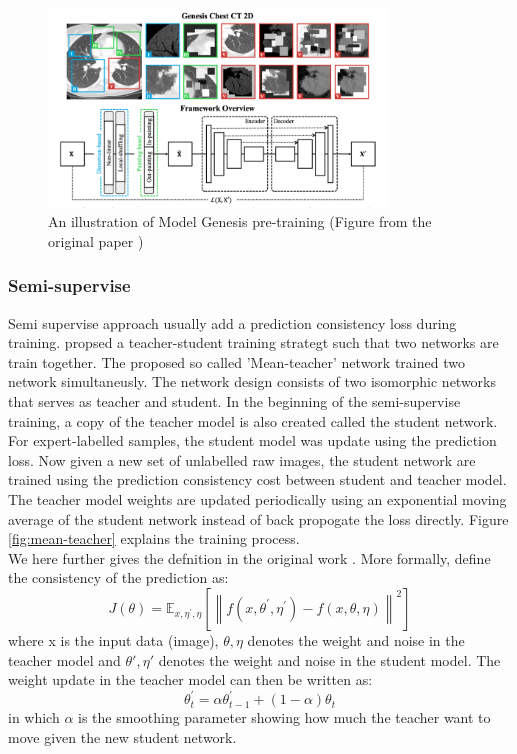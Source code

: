 \begin{figure}
	\centering
	\includegraphics[width=0.8\textwidth]{img/background_img/Genesis_illustration.png}
	\caption{An illustration of Model Genesis pre-training (Figure from the original paper \cite{zhou_models_2019})}
	\label{fig:genesis-net}
\end{figure}

\subsubsection{Semi-supervise}
Semi supervise approach usually add a prediction consistency loss during training. \cite{tarvainen_mean_2018} propsed a teacher-student training strategt such that two networks are train together. The proposed so called 'Mean-teacher' network trained two network simultaneusly. The network design consists of two isomorphic networks that serves as teacher and student. In the beginning of the semi-supervise training, a copy of the teacher model is also created called the student network. For expert-labelled samples, the student model was update using the prediction loss.
Now given a new set of unlabelled raw images, the student network are trained using the prediction consistency cost between student and teacher model. The teacher model weights are updated periodically using an exponential moving average of the student network instead of back propogate the loss directly. Figure \ref{fig:mean-teacher} explains the training process. \\

We here further gives the defnition in the original work \cite{tarvainen_mean_2018}. More formally, define the consistency of the prediction as:
$$J(\theta)=\mathbb{E}_{x, \eta^{\prime}, \eta}\left[\left\|f\left(x, \theta^{\prime}, \eta^{\prime}\right)-f(x, \theta, \eta)\right\|^{2}\right]$$
where x is the input data (image), $\theta, \eta$ denotes the weight and noise in the teacher model and $\theta', \eta'$ denotes the weight and noise in the student model.
The weight update in the teacher model can then be written as:
$$\theta_{t}^{\prime}=\alpha \theta_{t-1}^{\prime}+(1-\alpha) \theta_{t}$$ in which $\alpha$ is the smoothing parameter showing how much the teacher want to move given the new student network.\\

